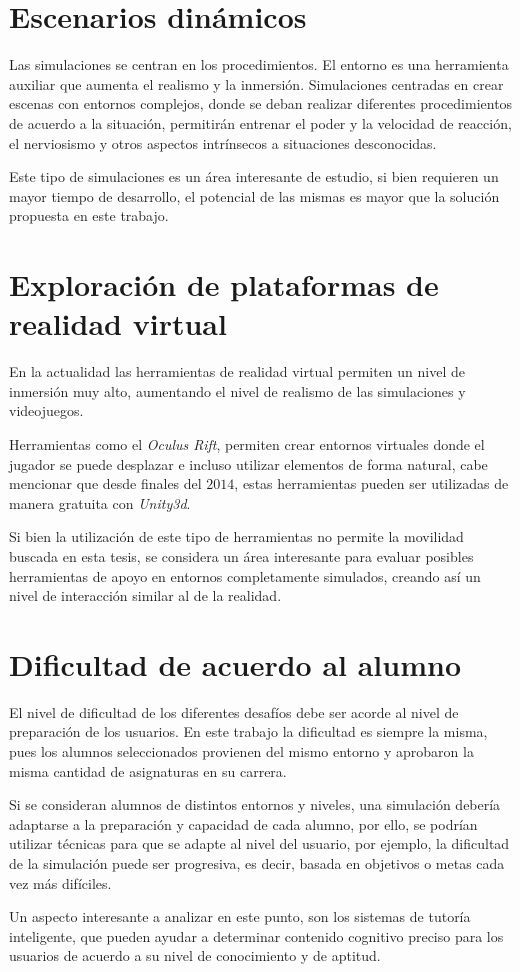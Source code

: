 \section{Escenarios dinámicos}

Las simulaciones se centran en los procedimientos. El entorno es una herramienta
auxiliar que aumenta el realismo y la inmersión. Simulaciones centradas en crear
escenas con entornos complejos, donde se deban realizar diferentes
procedimientos de acuerdo a la situación, permitirán entrenar el poder y la
velocidad de reacción, el nerviosismo y otros aspectos intrínsecos a situaciones
desconocidas. 

Este tipo de simulaciones es un área interesante de estudio, si bien requieren
un mayor tiempo de desarrollo, el potencial de las mismas es mayor que la
solución propuesta en este trabajo. 

\section{Exploración de plataformas de realidad virtual}

En la actualidad las herramientas de realidad virtual permiten un nivel de
inmersión muy alto, aumentando el nivel de realismo de las simulaciones y
videojuegos.     

Herramientas como el \emph{Oculus Rift}, permiten crear entornos virtuales donde
el jugador se puede desplazar e incluso utilizar elementos de forma
natural\cite{makerbot}, cabe mencionar que desde finales del $2014$, estas
herramientas pueden ser utilizadas de manera gratuita con
\emph{Unity3d}\cite{unity:vr}.

Si bien la utilización de este tipo de herramientas no permite la movilidad 
buscada en esta tesis, se considera un área interesante para evaluar posibles
herramientas de apoyo en entornos completamente simulados, creando así un nivel
de interacción similar al de la realidad.


\section{Dificultad de acuerdo al alumno}

El nivel de dificultad de los diferentes desafíos debe ser acorde al nivel de
preparación de los usuarios. En este trabajo la dificultad es siempre la misma,
pues los alumnos seleccionados provienen del mismo entorno y aprobaron la misma
cantidad de asignaturas en su carrera.

Si se consideran alumnos de distintos entornos y niveles, una simulación debería
adaptarse a la preparación y capacidad de cada alumno, por ello, se podrían
utilizar técnicas para que se adapte al nivel del usuario, por ejemplo, la
dificultad de la simulación puede ser progresiva, es decir, basada en objetivos
o metas cada vez más difíciles.

Un aspecto interesante a analizar en este punto, son los sistemas de tutoría
inteligente, que pueden ayudar a determinar contenido cognitivo preciso para los
usuarios de acuerdo a su nivel de conocimiento y de aptitud.
